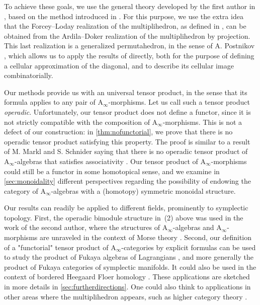 \documentclass[twoside, 12pt]{amsart}
\theoremstyle{remark}
\newcommand{\Ainf}{\mathrm{A}_\infty} %
\begin{document}
To achieve these goals, we use the general theory developed by the first author in \cite{LA21}, based on the method introduced in \cite{MTTV19}.
For this purpose, we use the extra idea that the Forcey--Loday realization of the multiplihedron, as defined in \cite{Forcey08}, can be obtained from the Ardila--Doker realization of the multiplihedron \cite{AD13} by projection.
This last realization is a generalized permutahedron, in the sense of A. Postnikov \cite{Postnikov09}, which allows us to apply the results of \cite{LA21} directly, both for the purpose of defining a cellular approximation of the diagonal, and to describe its cellular image combinatorially.

\medskip

Our methods provide us with an universal tensor product, in the sense that its formula applies to any pair of $\Ainf$-morphisms.
Let us call such a tensor product \emph{operadic}. 
Unfortunately, our tensor product does not define a functor, since it is not strictly compatible with the composition of $\Ainf$-morphisms. 
This is not a defect of our construction: in \cref{thm:nofunctorial}, we prove that there is no operadic tensor product satisfying this property. 
The proof is similar to a result of M. Markl and S. Schnider saying that there is no operadic tensor product of $\Ainf$-algebras that satisfies associativity \cite[Theorem 13]{MarklShnider06}.
Our tensor product of $\Ainf$-morphisms could still be a functor in some homotopical sense, and we examine in \cref{sec:monoidality} different perspectives regarding the possibility of endowing the category of $\Ainf$-algebras with a (homotopy) symmetric monoidal structure. 

\medskip

Our results can readily be applied to different fields, prominently to symplectic topology. 
First, the operadic bimodule structure in~(2) above was used in the work of the second author, where the structures of $\mathrm{A}_\infty$-algebras and $\mathrm{A}_\infty$-morphisms are unraveled in the context of Morse theory \cite{Mazuir21}. 
Second, our definition of a "functorial" tensor product of $\mathrm{A}_\infty$-categories by explicit formulas can be used to study the product of Fukaya algebras of Lagrangians \cite{amorim-lagrangian}, and more generally the product of Fukaya categories of symplectic manifolds. 
It could also be used in the context of bordered Heegaard Floer homology \cite{LOT20}. 
These applications are sketched in more details in \cref{sec:furtherdirections}.
One could also think to applications in other areas where the multiplihedron appears, such as higher category theory \cite{ForceyQuotient08}.
\end{document}
